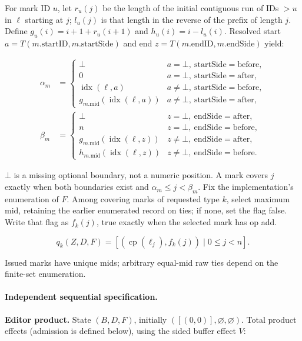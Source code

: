 For mark ID $u$, let $r_u(j)$ be the length of the initial contiguous run of IDs $>u$ in $\ell$ starting at $j$; $l_u(j)$ is that length in the reverse of the prefix of length $j$. Define $g_u(i)=i+1+r_u(i+1)$ and $h_u(i)=i-l_u(i)$. Resolved start $a=T(m.\mathrm{startID},m.\mathrm{startSide})$ and end $z=T(m.\mathrm{endID},m.\mathrm{endSide})$ yield:

\[
\begin{aligned}\alpha_m&=\begin{cases}\bot&a=\bot,\ \mathrm{startSide}=\mathrm{before},\\0&a=\bot,\ \mathrm{startSide}=\mathrm{after},\\\operatorname{idx}(\ell,a)&a\ne\bot,\ \mathrm{startSide}=\mathrm{before},\\g_{m.\mathrm{mid}}(\operatorname{idx}(\ell,a))&a\ne\bot,\ \mathrm{startSide}=\mathrm{after},\end{cases}\\\beta_m&=\begin{cases}\bot&z=\bot,\ \mathrm{endSide}=\mathrm{after},\\n&z=\bot,\ \mathrm{endSide}=\mathrm{before},\\g_{m.\mathrm{mid}}(\operatorname{idx}(\ell,z))&z\ne\bot,\ \mathrm{endSide}=\mathrm{after},\\h_{m.\mathrm{mid}}(\operatorname{idx}(\ell,z))&z\ne\bot,\ \mathrm{endSide}=\mathrm{before}.\end{cases}\end{aligned}
\]


$\bot$ is a missing optional boundary, not a numeric position. A mark covers $j$ exactly when both boundaries exist and $\alpha_m\le j<\beta_m$. Fix the implementation's enumeration of $F$. Among covering marks of requested type $k$, select maximum mid, retaining the earlier enumerated record on ties; if none, set the flag false. Write that flag as $f_k(j)$, true exactly when the selected mark has op add.

\[
q_k(Z,D,F)=[(\operatorname{cp}(\ell_j),f_k(j))\mid 0\le j<n].
\]


Issued marks have unique mids; arbitrary equal-mid raw ties depend on the finite-set enumeration.


\paragraph{Independent sequential specification.}
\textbf{Editor product.} State $(B,D,F)$, initially $([(0,0)],\varnothing,\varnothing)$. Total product effects (admission is defined below), using the sided buffer effect $V$:

